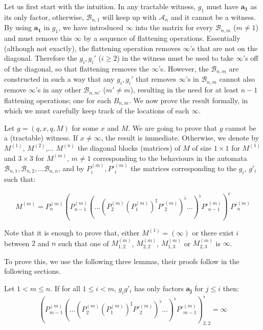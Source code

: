 \documentclass{lmcs}
\theoremstyle{remark}
\newcommand{\autA}{\mathcal{A}}
\newcommand{\autB}{\mathcal{B}}
\theoremstyle{remark}
\begin{document}
Let us first start with the intuition. In any tractable witness,  $g_1$ must have $\boldsymbol{a_1}$ as its only factor, otherwise, $\autB_{n,1}$ will keep up with $\autA_n$ and it cannot be a witness. By using $\boldsymbol{a_1}$ in $g_1$, we have introduced $\infty$ into the matrix for every $\autB_{n,m}$ ($m\ne 1$) and must remove this $\infty$ by a sequence of flattening operations. Essentially (although not exactly), the flattening operation removes $\infty$'s that are not on the diagonal. Therefore the $g_i,g_i'$ ($i\ge 2$) in the witness  must be used to take $\infty$'s off of the diagonal, so that flattening removes the $\infty$'s. However, the $\autB_{n,m}$ are constructed in such a way that any $g_i, g_i'$ that removes $\infty$'s in $\autB_{n,m}$ cannot also remove $\infty$'s in any other $\autB_{n,m'}$ ($m'\ne m$), resulting in the need for at least $n-1$ flattening operations; one for each $B_{n,m}$. We now prove the result formally, in which we must carefully keep track of the locations of each $\infty$.

Let $g = (q,x,q,M)$ for some $x$ and $M$. We are going to prove that $g$ cannot be a (tractable) witness. If $x \neq \infty$, the result is immediate. Otherwise, we denote by $M^{(1)}$, $M^{(2)}$,... $M^{(n)}$ the diagonal blocks (matrices) of $M$ of size $1\times 1$ for $M^{(1)}$ and $3\times 3$ for $M^{(m)}$, $m\neq 1$ corresponding to the behaviours in the automata $\autB_{n,1}, \autB_{n,2}, \ldots \autB_{n,n}$, and by $P^{(m)}_i,P'^{(m)}_i$ the matrices corresponding to the $g_i$, $g'_i$ such that:

$$M^{(m)} = P^{(m)}_n (P^{(m)}_{n-1} (\ldots (P^{(m)}_2 (P^{(m)}_1)^\sharp P'^{(m)}_2)^\flat \ldots)^\flat P'^{(m)}_{n-1})^\flat P'^{(m)}_n$$

Note that it is enough to prove that, either $M^{(1)} = (\infty)$ or there exist $i$ between $2$ and $n$ such that one of $M^{(m)}_{1,2}$, $M^{(m)}_{2,2}$, $M^{(m)}_{1,3}$ or $M^{(m)}_{2,3}$ is $\infty$.



To prove this, we use the following three lemmas, their proofs follow in the following sections.

\begin{lem}
\label{lemma:one}
Let $1< m\leq n$. If for all $1\leq i < m$, $g_ig'_i$ has only factors $\boldsymbol{a_j}$ for $j\leq i$ then:
$$(P^{(m)}_{m-1} (\ldots (P^{(m)}_2 (P^{(m)}_1)^\sharp P'^{(m)}_2)^\flat \ldots)^\flat P'^{(m)}_{m-1})^\flat_{2,2} = \infty$$
\end{lem}
\end{document}
